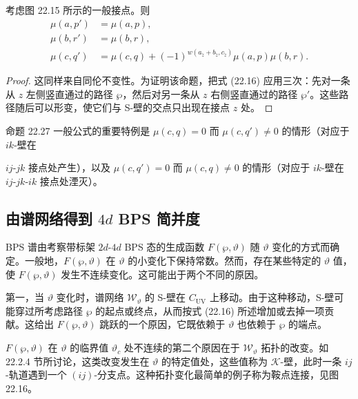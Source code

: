 
\begin{proposition}[22.27]
考虑图 22.15 所示的一般接点。则
\begin{align*}
\mu(a,p')&=\mu(a,p),\\
\mu(b,r')&=\mu(b,r),\\
\mu(c,q')&=\mu(c,q)+(-1)^{w(a_{\widetilde{z}}+b_{\widetilde{z}},c_{\widetilde{z}})}\mu(a,p)\mu(b,r).
\end{align*}
\end{proposition}

\begin{proof}
这同样来自同伦不变性。为证明该命题，把式 (22.16) 应用三次：先对一条从 $z$ 左侧竖直通过的路径 $\wp$，然后对另一条从 $z$ 右侧竖直通过的路径 $\wp'$。这些路径随后可以形变，使它们与 S-壁的交点只出现在接点 $z$ 处。
\end{proof}

命题 22.27 一般公式的重要特例是 $\mu(c,q)=0$ 而 $\mu(c,q')\ne0$ 的情形（对应于 $ik$-壁在

$ij$-$jk$ 接点处产生），以及 $\mu(c,q')=0$ 而 $\mu(c,q)\ne0$ 的情形（对应于 $ik$-壁在 $ij$-$jk$-$ik$ 接点处湮灭）。

\subsection{由谱网络得到 $4d$ BPS 简并度}

BPS 谱由考察带标架 $2d$-$4d$ BPS 态的生成函数 $F(\wp,\vartheta)$ 随 $\vartheta$ 变化的方式而确定。一般地，$F(\wp,\vartheta)$ 在 $\vartheta$ 的小变化下保持常数。然而，存在某些特定的 $\vartheta$ 值，使 $F(\wp,\vartheta)$ 发生不连续变化。这可能出于两个不同的原因。

第一，当 $\vartheta$ 变化时，谱网络 $\mathcal{W}_\vartheta$ 的 S-壁在 $C_{\mathrm{UV}}$ 上移动。由于这种移动，S-壁可能穿过所考虑路径 $\wp$ 的起点或终点，从而按式 (22.16) 所述增加或去掉一项贡献。这给出 $F(\wp,\vartheta)$ 跳跃的一个原因，它既依赖于 $\vartheta$ 也依赖于 $\wp$ 的端点。

$F(\wp,\vartheta)$ 在 $\vartheta$ 的临界值 $\vartheta_c$ 处不连续的第二个原因在于 $\mathcal{W}_\vartheta$ 拓扑的改变。如 22.2.4 节所讨论，这类改变发生在 $\vartheta$ 的特定值处，这些值称为 $\mathcal{K}$-壁，此时一条 $ij$-轨道遇到一个 $(ij)$-分支点。这种拓扑变化最简单的例子称为鞍点连接，见图 22.16。


